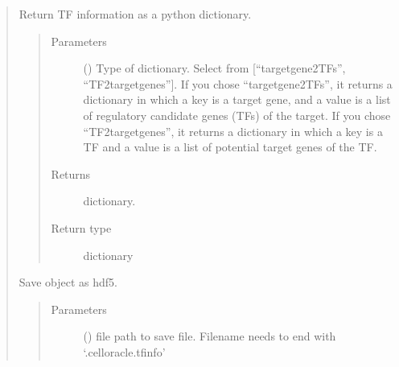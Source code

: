 \documentclass[letterpaper,10pt,english]{sphinxmanual}
\begin{document}
\begin{quote}
\begin{fulllineitems}
\begin{fulllineitems}
\label{\detokenize{modules/celloracle.motif_analysis:celloracle.motif_analysis.TFinfo.to_dictionary}}
Return TF information as a python dictionary.
\begin{quote}\begin{description}
\item[{Parameters}] \leavevmode
{} () \textendash{} Type of dictionary. Select from {[}“targetgene2TFs”, “TF2targetgenes”{]}.
If you chose “targetgene2TFs”, it returns a dictionary in which a key is a target gene, and a value is a list of regulatory candidate genes (TFs) of the target.
If you chose “TF2targetgenes”, it returns a dictionary in which a key is a TF and a value is a list of potential target genes of the TF.

\item[{Returns}] \leavevmode
dictionary.

\item[{Return type}] \leavevmode
dictionary

\end{description}\end{quote}

\end{fulllineitems}


\begin{fulllineitems}
\label{\detokenize{modules/celloracle.motif_analysis:celloracle.motif_analysis.TFinfo.to_hdf5}}
Save object as hdf5.
\begin{quote}\begin{description}
\item[{Parameters}] \leavevmode
{} () \textendash{} file path to save file. Filename needs to end with ‘.celloracle.tfinfo’

\end{description}\end{quote}

\end{fulllineitems}



\end{fulllineitems}
\end{quote}
\end{document}
